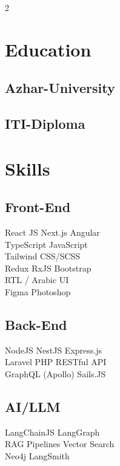 \documentclass[]{deedy-resume-reversed}
\begin{document}
\begin{paracol}{2}
\switchcolumn

\section{Education}

\subsection{Azhar-University}
\sectionsep

\subsection{ITI-Diploma}
\sectionsep

\section{Skills}

\subsection{Front-End}
React JS \textbullet{} Next.js \textbullet{} Angular \\
TypeScript \textbullet{} JavaScript \\
Tailwind \textbullet{} CSS/SCSS \\
Redux \textbullet{} RxJS \textbullet{} Bootstrap \\
RTL / Arabic UI \\
Figma \textbullet{} Photoshop
\sectionsep

\subsection{Back-End}
NodeJS \textbullet{} NestJS \textbullet{} Express.js \\
Laravel \textbullet{} PHP \textbullet{} RESTful API \\
GraphQL (Apollo) \textbullet{} Sails.JS
\sectionsep

\subsection{AI/LLM}
LangChainJS \textbullet{} LangGraph \\
RAG Pipelines \textbullet{} Vector Search \\
Neo4j \textbullet{} LangSmith
\sectionsep


\end{paracol}
\end{document}
